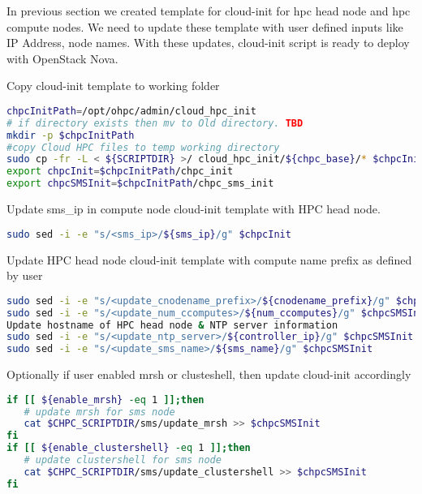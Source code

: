 In previous section we created template for cloud-init for hpc head node and hpc compute nodes. We need to update these template with user defined inputs like IP Address, node names. With these updates, cloud-init script is ready to deploy with OpenStack Nova.

Copy cloud-init template to working folder

\begin{lstlisting}[language=bash,keywords={}]
chpcInitPath=/opt/ohpc/admin/cloud_hpc_init
# if directory exists then mv to Old directory. TBD
mkdir -p $chpcInitPath
#copy Cloud HPC files to temp working directory
sudo cp -fr -L < ${SCRIPTDIR} >/ cloud_hpc_init/${chpc_base}/* $chpcInitPath/
export chpcInit=$chpcInitPath/chpc_init
export chpcSMSInit=$chpcInitPath/chpc_sms_init
\end{lstlisting}


Update sms\_ip in compute node cloud-init template with HPC head node. 

\begin{lstlisting}[language=bash,keywords={}]
sudo sed -i -e "s/<sms_ip>/${sms_ip}/g" $chpcInit
\end{lstlisting}


Update HPC head node cloud-init template with compute name prefix as defined by user

\begin{lstlisting}[language=bash,keywords={}]
sudo sed -i -e "s/<update_cnodename_prefix>/${cnodename_prefix}/g" $chpcSMSInit
sudo sed -i -e "s/<update_num_ccomputes>/${num_ccomputes}/g" $chpcSMSInit
Update hostname of HPC head node & NTP server information
sudo sed -i -e "s/<update_ntp_server>/${controller_ip}/g" $chpcSMSInit
sudo sed -i -e "s/<update_sms_name>/${sms_name}/g" $chpcSMSInit
\end{lstlisting}

Optionally if user enabled mrsh or clusteshell, then update cloud-init accordingly

\begin{lstlisting}[language=bash,keywords={}]
if [[ ${enable_mrsh} -eq 1 ]];then
   # update mrsh for sms node
   cat $CHPC_SCRIPTDIR/sms/update_mrsh >> $chpcSMSInit
fi
if [[ ${enable_clustershell} -eq 1 ]];then
   # update clustershell for sms node
   cat $CHPC_SCRIPTDIR/sms/update_clustershell >> $chpcSMSInit
fi
\end{lstlisting}
